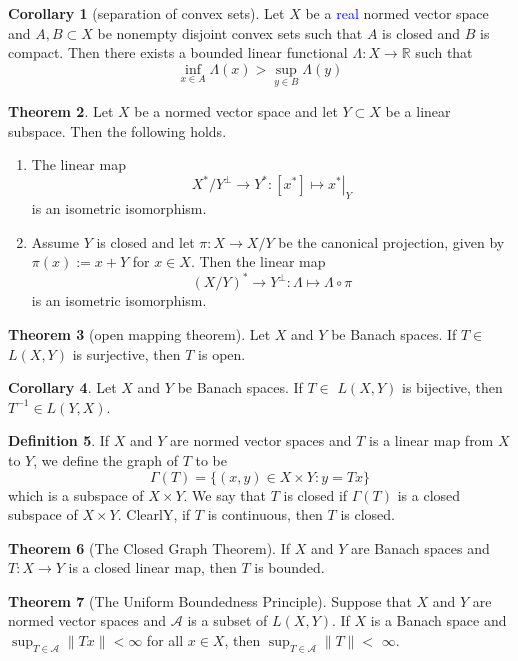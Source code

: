 \documentclass[12pt,a4paper]{book}
\newcommand{\blue}[1]{\textcolor{blue}{#1}}
\newenvironment{enu}{\begin{enumerate}[(1)]}{\end{enumerate}}
\theoremstyle{definition}
\newtheorem{defn}{Definition}[section]
\newtheorem{coro}[defn]{Corollary}
\newtheorem{theo}[defn]{Theorem}
\begin{document}
\begin{coro}[separation of convex sets]
    Let $X$ be a \blue{real} normed vector space and $A, B \subset X$ be nonempty disjoint convex sets such that $A$ is closed and $B$ is compact. Then there exists a bounded linear functional $\Lambda: X \rightarrow \mathbb{R}$ such that
    $$
    \inf _{x \in A} \Lambda(x)>\sup _{y \in B} \Lambda(y)
    $$
\end{coro}



\begin{theo}
    Let $X$ be a normed vector space and let $Y \subset X$ be a linear subspace. Then the following holds.
    \begin{enu} 
    \item The linear map
    $$
    X^* / Y^{\perp} \rightarrow Y^*:\left.\left[x^*\right] \mapsto x^*\right|_Y
    $$
    is an isometric isomorphism.
    \item Assume $Y$ is closed and let $\pi: X \rightarrow X / Y$ be the canonical projection, given by $\pi(x):=x+Y$ for $x \in X$. Then the linear map
    $$
    (X / Y)^* \rightarrow Y^{\perp}: \Lambda \mapsto \Lambda \circ \pi
    $$
    is an isometric isomorphism.
    \end{enu}
    \label{theorem: Banach space, quotient}
\end{theo}















\begin{theo}[open mapping theorem]
    Let $X$ and $Y$ be Banach spaces. If $T \in$ $L(X, Y)$ is surjective, then $T$ is open.
\end{theo}
\begin{coro}
    Let $X$ and $Y$ be Banach spaces. If $T \in$ $L(X, Y)$ is bijective, then $T^{-1}\in L(Y,X)$. 
\end{coro}
\begin{defn}
    If $X$ and $Y$ are normed vector spaces and $T$ is a linear map from $X$ to $Y$, we define the graph of $T$ to be
    $$
    \Gamma(T)=\{(x,y) \in X \times Y: y=Tx\}
    $$
    which is a subspace of $X \times Y$. We say that $T$ is closed if $\Gamma(T)$ is a closed subspace of $X \times Y$. ClearlY, if $T$ is continuous, then $T$ is closed.
\end{defn}
\begin{theo}[The Closed Graph Theorem]
    If $X$ and $Y$ are Banach spaces and $T: X \rightarrow Y$ is a closed linear map, then $T$ is bounded.
\end{theo}
\begin{theo}[The Uniform Boundedness Principle]
    Suppose that $X$ and $Y$ are normed vector spaces and $\mathcal{A}$ is a subset of $L(X, Y)$.
If $X$ is a Banach space and $\sup _{T \in \mathcal{A}}\|T x\|<\infty$ for all $x \in X$, then $\sup _{T \in \mathcal{A}}\|T\|<$ $\infty$.

\end{theo}
\end{document}
